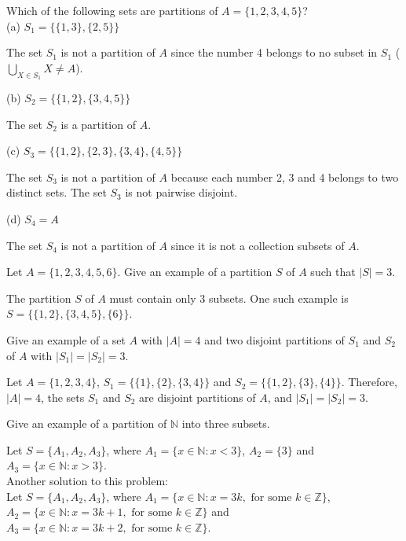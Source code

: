 \documentclass[12pt]{article}
\newcommand{\N}{\mathbb{N}}
\newcommand{\Z}{\mathbb{Z}}
\newenvironment{problem}[2][Problem]{\begin{trivlist}
		\item[\hskip \labelsep {\bfseries #1}\hskip \labelsep {\bfseries #2.}]}{\end{trivlist}}
\newenvironment{solution}[2][Solution]{\begin{trivlist}
		\item[\hskip \labelsep {\bfseries #1}\hskip \labelsep {\bfseries #2.}]}{\end{trivlist}}
\begin{document}
\begin{problem}{47}
	Which of the following sets are partitions of $A=\{1,2,3,4,5\}$?\\
	
	(a) $S_{1} = \{\{1,3\},\{2,5\}\}$
	\begin{solution}{a}
		The set $S_{1}$ is not a partition of $A$ since the number 4 belongs to no subset in $S_{1}$ ($\bigcup_{X\in S_{1}}X \neq A$).
	\end{solution}

	(b) $S_{2} = \{\{1,2\},\{3,4,5\}\}$
	\begin{solution}{b}
		The set $S_{2}$ is a partition of $A$. 
	\end{solution}

	(c) $S_{3} = \{\{1,2\},\{2,3\},\{3,4\},\{4,5\}\}$
	\begin{solution}{c}
		The set $S_{3}$ is not a partition of $A$ because each number 2, 3 and 4 belongs to two distinct sets. The set $S_{3}$ is not pairwise disjoint.
	\end{solution}

	(d) $S_{4} = A$
	\begin{solution}{d} 
		The set $S_{4}$ is not a partition of $A$ since it is not a collection subsets of $A$.
	\end{solution}
\end{problem}

\begin{problem}{48}
	Let $A = \{1,2,3,4,5,6\}$. Give an example of a partition $S$ of $A$ such that $|S| = 3$.
	\begin{solution}{}
		The partition $S$ of $A$ must contain only 3 subsets. One such example is $S=\{\{1,2\},\{3,4,5\},\{6\}\}$.
	\end{solution}
\end{problem}

\begin{problem}{49}
	Give an example of a set $A$ with $|A|=4$ and two disjoint partitions of $S_{1}$ and $S_{2}$ of $A$ with $|S_{1}|=|S_{2}|=3$.
	\begin{solution}{}
		Let $A=\{1,2,3,4\}$, $S_{1} = \{\{1\},\{2\},\{3,4\}\}$ and $S_{2} = \{\{1,2\},\{3\},\{4\}\}$.
		Therefore, $|A| = 4$, the sets $S_{1}$ and $S_{2}$ are disjoint partitions of $A$, and $|S_{1}|=|S_{2}|=3$.
	\end{solution}
\end{problem}

\begin{problem}{50}
	Give an example of a partition of $\N$ into three subsets.
	\begin{solution}{}
		Let $S=\{A_{1}, A_{2}, A_{3}\}$, where $A_{1} = \{x\in \N: x<3\}$, $A_{2} = \{3\}$ and $A_{3} = \{x \in \N: x>3\}$. \\ 
		Another solution to this problem:\\
		Let $S=\{A_{1}, A_{2}, A_{3}\}$, where $A_{1} = \{x\in \N: x = 3k, \text{ for some } k\in \Z\}$, $A_{2} = \{x\in \N: x = 3k+1, \text{ for some } k\in \Z\}$ and $A_{3} = \{x\in \N: x = 3k+2, \text{ for some } k\in \Z\}$.
	\end{solution} 
\end{problem}
\end{document}
